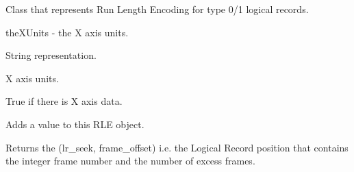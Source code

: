 \documentclass[letterpaper,10pt,english]{sphinxmanual}
\begin{document}

\begin{fulllineitems}
\label{\detokenize{ref/LIS/core/Rle:TotalDepth.LIS.core.Rle.RLEType01}}
Class that represents Run Length Encoding for type 0/1 logical records.

theXUnits - the X axis units.

\begin{fulllineitems}
\label{\detokenize{ref/LIS/core/Rle:TotalDepth.LIS.core.Rle.RLEType01.__str__}}
String representation.

\end{fulllineitems}


\begin{fulllineitems}
\label{\detokenize{ref/LIS/core/Rle:TotalDepth.LIS.core.Rle.RLEType01.xAxisUnits}}
X axis units.

\end{fulllineitems}


\begin{fulllineitems}
\label{\detokenize{ref/LIS/core/Rle:TotalDepth.LIS.core.Rle.RLEType01.hasXaxisData}}
True if there is X axis data.

\end{fulllineitems}


\begin{fulllineitems}
\label{\detokenize{ref/LIS/core/Rle:TotalDepth.LIS.core.Rle.RLEType01.add}}
Adds a value to this RLE object.

\end{fulllineitems}


\begin{fulllineitems}
\label{\detokenize{ref/LIS/core/Rle:TotalDepth.LIS.core.Rle.RLEType01.tellLrForFrame}}
Returns the (lr\_seek, frame\_offset) i.e. the Logical Record position
that contains the integer frame number and the number of excess frames.


\end{fulllineitems}
\end{fulllineitems}
\end{document}
